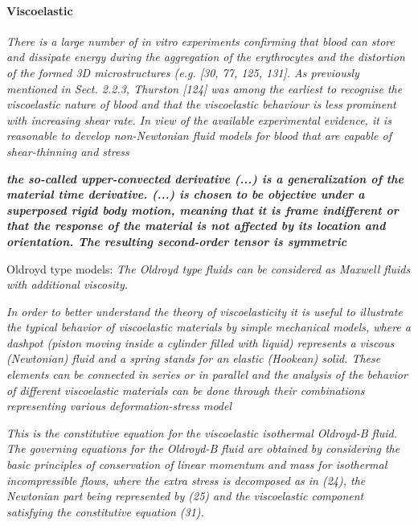 \documentclass[11pt,letterpaper]{article}
\begin{document}
\paragraph{Viscoelastic}
\textit{
There is a large number of in vitro experiments confirming that blood can store
and dissipate energy during the aggregation of the erythrocytes and the distortion
of the formed 3D microstructures (e.g. [30, 77, 125, 131]. As previously mentioned
in Sect. 2.2.3, Thurston [124] was among the earliest to recognise the viscoelastic
nature of blood and that the viscoelastic behaviour is less prominent with increasing
shear rate. In view of the available experimental evidence, it is reasonable to develop
non-Newtonian fluid models for blood that are capable of shear-thinning and stress}

\textit{
\textbf{the so-called upper-convected derivative (...) is a generalization of the material time derivative. (...) is chosen to be objective under a superposed rigid body motion, meaning that it is frame indifferent or that the response of the material is not affected by its location and orientation. The resulting second-order tensor is symmetric}
}


Oldroyd type models: \textit{The Oldroyd type fluids can be considered as Maxwell fluids with additional viscosity.}


\textit{In order to better understand the theory of viscoelasticity it is useful to illustrate
the typical behavior of viscoelastic materials by simple mechanical models, where a dashpot (piston moving inside a cylinder filled with liquid) represents a viscous (Newtonian) fluid and a spring stands for an elastic (Hookean) solid. These elements can be connected in series or in parallel and the analysis of the behavior of different viscoelastic materials can be done through their combinations representing various deformation-stress model}



\textit{This is the constitutive equation for the viscoelastic isothermal Oldroyd-B fluid.
The governing equations for the Oldroyd-B fluid are obtained by considering
the basic principles of conservation of linear momentum and mass for isothermal
incompressible flows, where the extra stress is decomposed as in (24), the
Newtonian part being represented by (25) and the viscoelastic component
satisfying the constitutive equation (31).}
\end{document}
